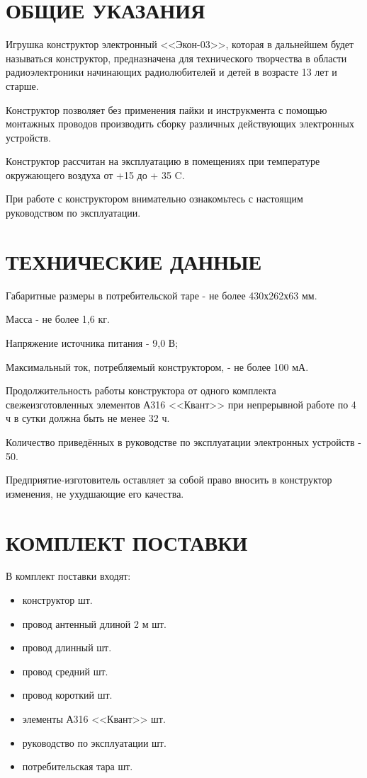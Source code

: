 \documentclass[12pt]{article}
\begin{document}
\section{ОБЩИЕ УКАЗАНИЯ}
Игрушка конструктор электронный <<Экон-03>>, которая в дальнейшем будет называться конструктор, предназначена для технического творчества в области радиоэлектроники начинающих радиолюбителей и детей в возрасте 13 лет и старше.

Конструктор позволяет без применения пайки и инструкмента с помощью монтажных проводов производить сборку различных действующих электронных устройств.

Конструктор рассчитан на эксплуатацию в помещениях при температуре окружающего воздуха от +15 до + 35 \degree C.

При работе с конструктором внимательно ознакомьтесь с настоящим руководством по эксплуатации.

\section{ТЕХНИЧЕСКИЕ ДАННЫЕ}

Габаритные размеры в потребительской таре - не более 430х262х63 мм.

Масса - не более 1,6 кг.

Напряжение источника питания - 9,0 В;

Максимальный ток, потребляемый конструктором, - не более 100 мА.

Продолжительность работы конструктора от одного комплекта свежеизготовленных элементов А316 <<Квант>> при непрерывной работе по 4 ч в сутки должна быть не менее 32 ч.

Количество приведённых в руководстве по эксплуатации электронных устройств - 50.

Предприятие-изготовитель оставляет за собой право вносить в конструктор изменения, не ухудшающие его качества.

\section{КОМПЛЕКТ ПОСТАВКИ}
В комплект поставки входят:
\begin{itemize}
  \setlength\itemsep{-0.2em}
  \item[] конструктор  шт.
\newpage
  \item[] провод антенный длиной 2 м  шт.
  \item[] провод длинный  шт.
  \item[] провод средний  шт.
  \item[] провод короткий  шт.
  \item[] элементы А316 <<Квант>>  шт.
  \item[] руководство по эксплуатации  шт.
  \item[] потребительская тара  шт.
\end{itemize}
\end{document}
